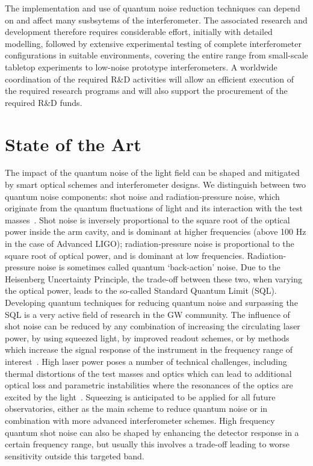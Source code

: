 The implementation and use of quantum noise reduction techniques can depend on and affect many susbsytems of the interferometer. The associated research and development therefore requires considerable effort, initially with detailed modelling, followed by extensive experimental testing of complete interferometer configurations in suitable environments, covering the entire range from small-scale tabletop experiments to low-noise prototype interferometers. A worldwide coordination of the required R\&D activities will allow an efficient execution of the required research programs and will also support the procurement of the required R\&D funds. 

\section{State of the Art}
The impact of the quantum noise of the light field can be shaped and mitigated by smart optical schemes and interferometer designs. We distinguish between two quantum noise components: shot noise and radiation-pressure noise, which originate from the quantum fluctuations of light and its interaction with the test masses~\cite{Cav1980}. Shot noise is inversely proportional to the square root of the optical power inside the arm cavity, and is dominant at higher frequencies (above 100 Hz in the case of Advanced LIGO); radiation-pressure noise is proportional to the square root of optical power, and is dominant at low frequencies. Radiation-pressure noise is sometimes called quantum `back-action' noise. Due to the Heisenberg Uncertainty Principle, the trade-off between these two, when varying the optical power, leads to the so-called Standard Quantum Limit (SQL). Developing quantum techniques for reducing quantum noise and surpassing the SQL is a very active field of research in the GW community. 
The influence of shot noise can be reduced by any combination of increasing the circulating laser power, by using squeezed light, by improved readout schemes, or by methods which increase the signal response of the instrument in the frequency range of interest~\cite{StMe1991,Mizuno:RSE1993,Osamu:2006}. High laser power poses a number of technical challenges, including thermal distortions of the test masses and optics which can lead to additional optical loss and parametric instabilities where the resonances of the optics are excited by the light~\cite{BSV2001,Evans:2015raa}. Squeezing is anticipated to be applied for all future observatories, either as the main scheme to reduce quantum noise or in combination with more advanced interferometer schemes. High frequency quantum shot noise can also be shaped by enhancing the detector response in a certain frequency range, but usually this involves a trade-off leading to worse sensitivity outside this targeted band.  

